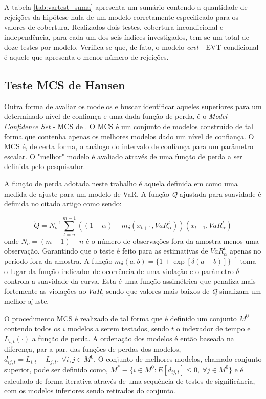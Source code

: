 \documentclass[1p]{elsarticle}
\theoremstyle{definition}
\begin{document}
A tabela \ref{tab:vartest_suma} apresenta um sumário contendo a quantidade de rejeições da hipótese nula de um modelo corretamente especificado para os valores de cobertura. Realizados dois testes, cobertura incondicional e independência, para cada um dos seis índices investigados, tem-se um total de doze testes por modelo. Verifica-se que, de fato, o modelo \emph{cevt} - EVT condicional é aquele que apresenta o menor número de rejeições.



\subsection{Teste MCS de Hansen}
\label{sec:mcs}

Outra forma de avaliar os modelos e buscar identificar aqueles superiores para um determinado nível de confiança e uma dada função de perda, é o \emph{Model Confidence Set} - MCS de \cite{Hansen2011}. O MCS é um conjunto de modelos construído de tal forma que contenha apenas os melhores modelos dado um nível de confiança. O MCS é, de certa forma, o análogo do intervalo de confiança para um parâmetro escalar. O "melhor" modelo é avaliado através de uma função de perda a ser definida pelo pesquisador.

A função de perda adotada neste trabalho é aquela definida em \cite{Gonzalez-Rivera2004} como uma medida de ajuste para um modelo de VaR. A função \emph{\~{Q}} ajustada para suavidade é definida no citado artigo como sendo:

\begin{equation}
	\tilde{Q} = N_o^{-1}\sum_{t=n}^{m-1}((1-\alpha)-m_\delta(x_{t+1}, VaR^t_\alpha))(x_{t+1}, VaR^t_\alpha)
\end{equation}
onde $N_o = (m-1)-n$ é o número de observações fora da amostra menos uma observação. Garantindo que o teste é feito para as estimativas de $VaR^t_\alpha$ apenas no período fora da amostra. A função $m_\delta(a, b)=\{1+\exp[\delta(a-b)]\}^{-1}$ toma o lugar da função indicador de ocorrência de uma violação e o parâmetro $\delta$ controla a suavidade da curva. Esta é uma função assimétrica que penaliza mais fortemente as violações ao $VaR$, sendo que valores mais baixos de \emph{\~{Q}} sinalizam um melhor ajuste.

O procedimento MCS é realizado de tal forma que é definido um conjunto $M^0$ contendo todos os $i$ modelos a serem testados, sendo $t$ o indexador de tempo e $L_{i, t}(\cdot)$ a função de perda. A ordenação dos modelos é então baseada na diferença, par a par, das funções de perdas dos modelos, $d_{ij, t} = L_{i, t}-L_{j, t}, \ \forall i,j \in M^0$. O conjunto de melhores modelos, chamado conjunto superior, pode ser definido como, $M^\ast \equiv \{i \in M^0 : E[d_{ij,t}] \leq 0, \ \forall j \in M^0\}$ e é calculado de forma iterativa através de uma sequência de testes de significância, com os modelos inferiores sendo retirados do conjunto.
\end{document}
